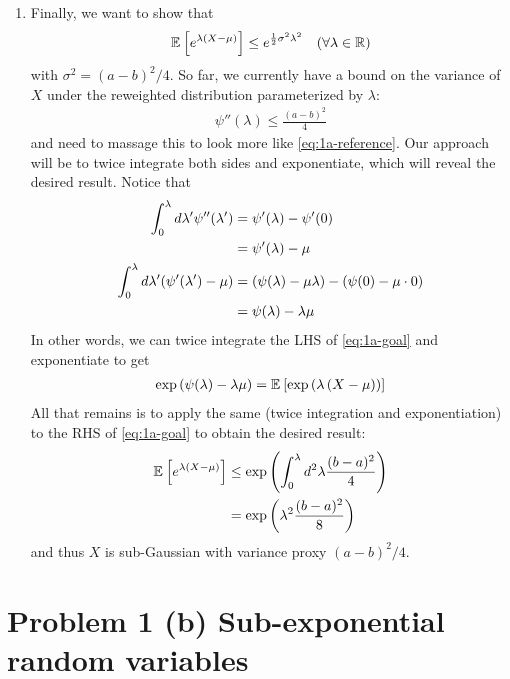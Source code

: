 \documentclass[11pt]{article}
\newcommand{\1}{\mathbb{I}} %
\begin{document}
\begin{enumerate}
	\item Finally, we want to show that 
	\begin{align}
		\mathbb{E}_{}\left[e^{\lambda (X - \mu)}\right] \leq e^{\frac{1}{2} \sigma^2 \lambda^2} \quad (\forall \lambda \in \mathbb{R})  \label{eq:1a-reference}
	\end{align}
	with $\sigma^2 = (a- b)^2 / 4$.  So far, we currently have a bound on the variance of $X$ under the reweighted distribution parameterized by $\lambda$:  
	\begin{align}
		\psi''(\lambda) \leq \frac{(a-b)^2}{4}  \label{eq:1a-goal}
	\end{align}
	and need to massage this to look more like \ref{eq:1a-reference}. Our approach will be to twice integrate both sides and exponentiate, which will reveal the desired result. Notice that
	\begin{align}
		\int_0^{\lambda} d\lambda' \psi''(\lambda') 
			&= \psi'(\lambda) - \psi'(0) \\
			&= \psi'(\lambda) - \mu  \\
		\int_0^{\lambda} d\lambda' (\psi'(\lambda') - \mu) 
			&= \left( \psi(\lambda) - \mu \lambda \right) - \left(  \psi(0) - \mu \cdot 0  \right) \\
			&= \psi(\lambda) - \lambda \mu 
	\end{align}
	In other words, we can twice integrate the LHS of \ref{eq:1a-goal} and exponentiate to get
	\begin{align}
		\exp\left( \psi(\lambda) - \lambda \mu	\right) = \mathbb{E}_{}\left[\exp\left(  \lambda\left( X - \mu  \right)  \right)\right]
	\end{align}
	All that remains is to apply the same (twice integration and exponentiation) to the RHS of \ref{eq:1a-goal} to obtain the desired result:
	\begin{align}
	\mathbb{E}_{}\left[e^{\lambda (X - \mu)}\right] 
			&\leq  \exp\left(  \int_0^{\lambda} d^2\lambda  \frac{(b - a)^2}{4}  \right) \\
			&= \exp\left(  \lambda^2 \frac{(b - a)^2}{8}  \right)
	\end{align}
	and thus $X$ is sub-Gaussian with variance proxy $(a-b)^2 / 4$. 

\end{enumerate}
	
\clearpage
\section*{Problem 1 (b)  Sub-exponential random variables }	
\end{document}
